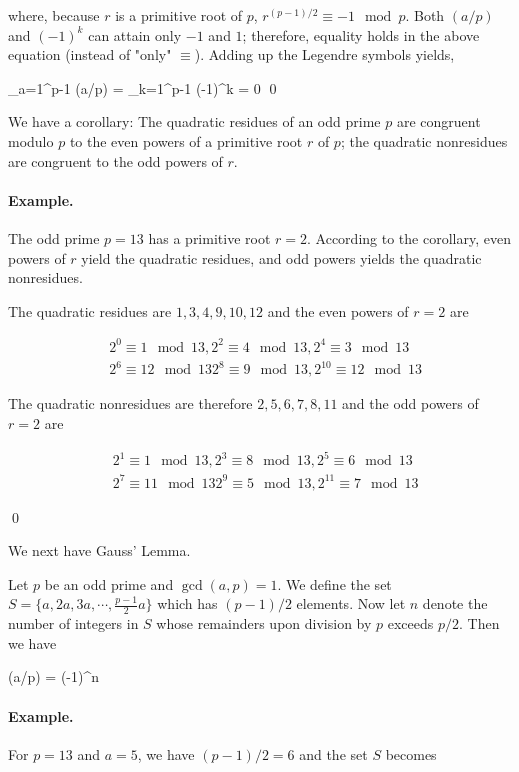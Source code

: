 where, because $r$ is a primitive root of $p$, $r^{(p-1)/2} \equiv -1 \mod p$. Both $(a/p)$ and $(-1)^k$ can attain only $-1$ and $1$; therefore, equality holds in the above equation (instead of "only" $\equiv$). Adding up the Legendre symbols yields,

\bee
\sum_{a=1}^{p-1} (a/p) = \sum_{k=1}^{p-1} (-1)^k = 0 \qed
\eee

We have a corollary: The quadratic residues of an odd prime $p$ are congruent modulo $p$ to the even powers of a primitive root $r$ of $p$; the quadratic nonresidues are congruent to the odd powers of $r$.

\paragraph{Example.} The odd prime $p=13$ has a primitive root $r=2$. According to the corollary, even powers of $r$ yield the quadratic residues, and odd powers yields the quadratic nonresidues.

The quadratic residues are $1, 3, 4, 9, 10, 12$ and the even powers of $r=2$ are

\begin{align*}
& 2^0 \equiv 1 \mod 13, 2^2 \equiv 4 \mod 13, 2^4 \equiv 3 \mod 13 \\
& 2^6 \equiv 12 \mod 13 2^8 \equiv 9 \mod 13, 2^{10} \equiv 12 \mod 13
\end{align*}

The quadratic nonresidues are therefore $2, 5, 6, 7, 8, 11$ and the odd powers of $r=2$ are

\begin{align*}
& 2^1 \equiv 1 \mod 13, 2^3 \equiv 8 \mod 13, 2^5 \equiv 6 \mod 13 \\
& 2^7 \equiv 11 \mod 13 2^9 \equiv 5 \mod 13, 2^{11} \equiv 7 \mod 13
\end{align*}

\qed

We next have Gauss' Lemma.

\begin{theorem}
Let $p$ be an odd prime and $\gcd(a,p)=1$. We define the set $S = \{a, 2a, 3a, \cdots, \frac{p-1}{2}a \}$ which has $(p-1)/2$ elements. Now let $n$ denote the number of integers in $S$ whose remainders upon division by $p$ exceeds $p/2$. Then we have

\bee
(a/p) = (-1)^n
\eee

\end{theorem}

\paragraph{Example.} For $p=13$ and $a=5$, we have $(p-1)/2 = 6$ and the set $S$ becomes

